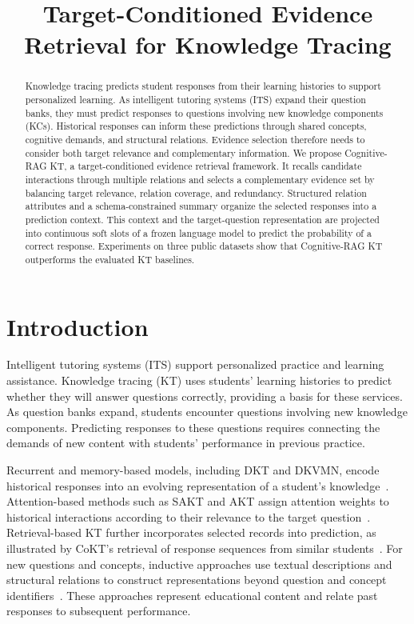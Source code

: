 \documentclass{llncs}
\begin{document}
\title{Target-Conditioned Evidence Retrieval for Knowledge Tracing}
\author{}
\maketitle

\begin{abstract}
Knowledge tracing predicts student responses from their learning histories to support personalized learning. As intelligent tutoring systems (ITS) expand their question banks, they must predict responses to questions involving new knowledge components (KCs). Historical responses can inform these predictions through shared concepts, cognitive demands, and structural relations. Evidence selection therefore needs to consider both target relevance and complementary information. We propose Cognitive-RAG KT, a target-conditioned evidence retrieval framework. It recalls candidate interactions through multiple relations and selects a complementary evidence set by balancing target relevance, relation coverage, and redundancy. Structured relation attributes and a schema-constrained summary organize the selected responses into a prediction context. This context and the target-question representation are projected into continuous soft slots of a frozen language model to predict the probability of a correct response. Experiments on three public datasets show that Cognitive-RAG KT outperforms the evaluated KT baselines.


\end{abstract}

\section{Introduction}

Intelligent tutoring systems (ITS) support personalized practice and learning assistance. Knowledge tracing (KT) uses students' learning histories to predict whether they will answer questions correctly, providing a basis for these services. As question banks expand, students encounter questions involving new knowledge components. Predicting responses to these questions requires connecting the demands of new content with students' performance in previous practice.

Recurrent and memory-based models, including DKT and DKVMN, encode historical responses into an evolving representation of a student's knowledge~\cite{piech2015deep,zhang2017dynamic}. Attention-based methods such as SAKT and AKT assign attention weights to historical interactions according to their relevance to the target question~\cite{pandey2019sakt,ghosh2020akt}. Retrieval-based KT further incorporates selected records into prediction, as illustrated by CoKT's retrieval of response sequences from similar students~\cite{long2022cokt}. For new questions and concepts, inductive approaches use textual descriptions and structural relations to construct representations beyond question and concept identifiers~\cite{fu2024sinkt}. These approaches represent educational content and relate past responses to subsequent performance.
\end{document}
